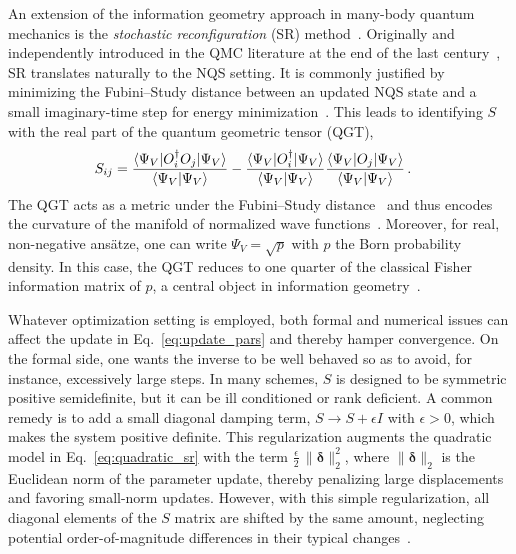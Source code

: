 An extension of the information geometry approach in many-body quantum mechanics is the \emph{stochastic reconfiguration} (SR) method~\cite{stokes_quantum_2020}. Originally and independently introduced in the QMC literature at the end of the last century~\cite{sorella1998,sorella_wave_2005}, SR translates naturally to the NQS setting. It is commonly justified by minimizing the Fubini–Study distance between an updated NQS state and a small imaginary-time step for energy minimization~\cite{sorella1998,stokes_quantum_2020,park_geometry_2020}. This leads to identifying $S$ with the real part of the quantum geometric tensor (QGT),
\begin{align}
S_{ij}
&= \frac{\braket{\Psi_V| O_i^\dagger O_j | \Psi_V}}{\braket{\Psi_V|\Psi_V}}
 - \frac{\braket{\Psi_V|O_i^\dagger|\Psi_V}}{\braket{\Psi_V|\Psi_V}}
   \frac{\braket{\Psi_V|O_j|\Psi_V}}{\braket{\Psi_V|\Psi_V}}\, .
\end{align}
The QGT acts as a metric under the Fubini–Study distance~\cite{stokes_quantum_2020,park_geometry_2020} and thus encodes the curvature of the manifold of normalized wave functions~\cite{dash_efficiency_2025}. Moreover, for real, non-negative ans\"atze, one can write $\Psi_V=\sqrt{p}$ with $p$ the Born probability density. In this case, the QGT reduces to one quarter of the classical Fisher information matrix of $p$, a central object in information geometry~\cite{amari_information_2016}.

Whatever optimization setting is employed, both formal and numerical issues can affect the update in Eq.~\eqref{eq:update_pars} and thereby hamper convergence. On the formal side, one wants the inverse to be well behaved so as to avoid, for instance, excessively large steps. In many schemes, \(S\) is designed to be symmetric positive semidefinite, but it can be ill conditioned or rank deficient. A common remedy is to add a small diagonal damping term, \(S \to S + \epsilon I\) with \(\epsilon>0\), which makes the system positive definite. This regularization augments the quadratic model in Eq.~\eqref{eq:quadratic_sr} with the term \(\tfrac{\epsilon}{2}\,\|\boldsymbol{\delta}\|_2^{2}\), where \(\|\boldsymbol{\delta}\|_2\) is the Euclidean norm of the parameter update, thereby penalizing large displacements and favoring small-norm updates. However, with this simple regularization, all diagonal elements of the $S$ matrix are shifted by the same amount, neglecting potential order-of-magnitude differences in their typical changes~\cite{sorella_weak_2007}. 

